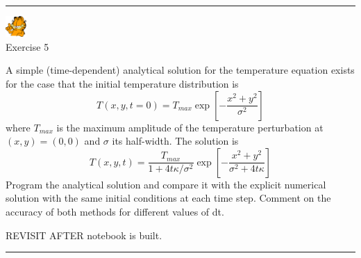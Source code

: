 \begin{center}
\begin{minipage}[t]{0.77\textwidth}
\par\noindent\rule{\textwidth}{0.4pt}
\begin{center}
\includegraphics[width=0.8cm]{images/garftr} \\
{\color{orange}Exercise 5}
\end{center}


A simple (time-dependent) analytical solution for the temperature equation exists for 
the case that the initial temperature distribution is
\[
T(x,y,t=0) = T_{max} \exp \left[ -\frac{x^2+y^2}{\sigma^2}   \right]
\]
where $T_{max}$ is the maximum amplitude of the temperature perturbation 
at $(x,y) = (0, 0)$ and $\sigma$ its half-width. The solution is
\[
T(x,y,t)=\frac{T_{max}}{1+4t\kappa/\sigma^2 } \exp \left[ -\frac{x^2+y^2}{\sigma^2 + 4t\kappa}   \right]
\]
Program the analytical solution and compare it with the explicit 
numerical solution with the same initial conditions at each time step. 
Comment on the accuracy of both methods for different values of dt.

REVISIT AFTER notebook is built.

\par\noindent\rule{\textwidth}{0.4pt}
\end{minipage}
\end{center}











